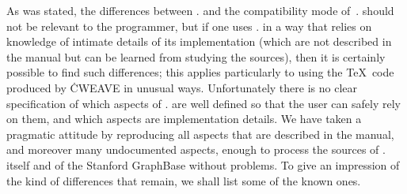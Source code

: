 As was stated, the differences between \LKC. and the compatibility mode
of~\CWEBx. should not be relevant to the programmer, but if one uses \LKC.
in a way that relies on knowledge of intimate details of its implementation
(which are not described in the manual but can be learned from studying the
sources), then it is certainly possible to find such differences; this
applies particularly to using the \TeX~code produced by \.{CWEAVE} in
unusual ways. Unfortunately there is no clear specification of which aspects
of \CWEB. are well defined so that the user can safely rely on them, and
which aspects are implementation details. We have taken a pragmatic attitude
by reproducing all aspects that are described in the manual, and moreover
many undocumented aspects, enough to process the sources of \LKC. itself and
of the Stanford GraphBase without problems. To give an impression of the
kind of differences that remain, we shall list some of the known ones.

